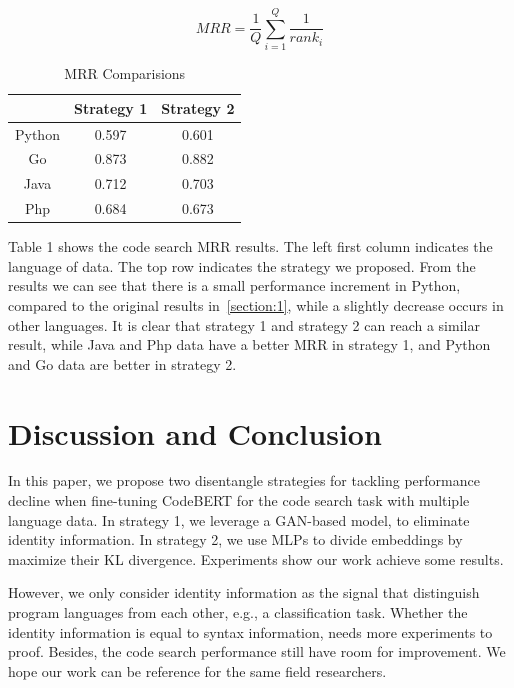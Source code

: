 \begin{equation}\label{MRR}
	MRR = \frac{1}{Q} \sum_{i=1}^Q \frac{1}{rank_i}
\end{equation}

\begin{table}[htbp]
	\centering
	\caption{MRR Comparisions}
	\begin{tabular}{ccc}
	\toprule
	& Strategy 1 & Strategy 2 \\
	\midrule
	Python & 0.597 & 0.601 \\
	Go  & 0.873 & 0.882 \\
	Java & 0.712 & 0.703 \\
	Php & 0.684 & 0.673 \\
	\bottomrule
	\end{tabular}%
	\label{tab:mrr_comparision}%
\end{table}%

Table 1 shows the code search MRR results. 
The left first column indicates the language of data. 
The top row indicates the strategy we proposed. 
From the results we can see that there is a small performance increment in Python, 
compared to the original results in~\ref{section:1}, 
while a slightly decrease occurs in other languages.
It is clear that strategy 1 and strategy 2 can reach a similar result, 
while Java and Php data have a better MRR in strategy 1, 
and Python and Go data are better in strategy 2.

\section{Discussion and Conclusion}
In this paper, we propose two disentangle strategies 
for tackling performance decline when fine-tuning CodeBERT 
for the code search task with multiple language data. 
In strategy 1, we leverage a GAN-based model, to eliminate identity information. 
In strategy 2, we use MLPs to divide embeddings by maximize their KL divergence. 
Experiments show our work achieve some results. 

However, we only consider identity information as the signal that 
distinguish program languages from each other, e.g., a classification task. 
Whether the identity information is equal to syntax information, 
needs more experiments to proof. Besides, the code search performance 
still have room for improvement. We hope our work can be reference for 
the same field researchers.

